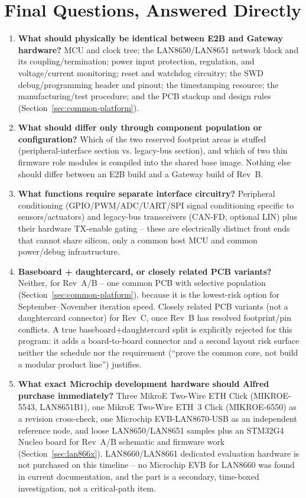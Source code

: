 \section{Final Questions, Answered Directly}
\label{sec:final-questions}

\begin{enumerate}[itemsep=0.4em]

\item \textbf{What should physically be identical between E2B and Gateway hardware?}
MCU and clock tree; the LAN8650/LAN8651 network block and its coupling/termination; power input protection, regulation, and voltage/current monitoring; reset and watchdog circuitry; the SWD debug/programming header and pinout; the timestamping resource; the manufacturing/test procedure; and the PCB stackup and design rules (Section~\ref{sec:common-platform}).

\item \textbf{What should differ only through component population or configuration?}
Which of the two reserved footprint areas is stuffed (peripheral-interface section vs. legacy-bus section), and which of two thin firmware role modules is compiled into the shared base image. Nothing else should differ between an E2B build and a Gateway build of Rev~B.

\item \textbf{What functions require separate interface circuitry?}
Peripheral conditioning (GPIO/PWM/ADC/UART/SPI signal conditioning specific to sensors/actuators) and legacy-bus transceivers (CAN-FD, optional LIN) plus their hardware TX-enable gating -- these are electrically distinct front ends that cannot share silicon, only a common host MCU and common power/debug infrastructure.

\item \textbf{Baseboard + daughtercard, or closely related PCB variants?}
Neither, for Rev~A/B -- one common PCB with selective population (Section~\ref{sec:common-platform}), because it is the lowest-risk option for September--November iteration speed. Closely related PCB variants (not a daughtercard connector) for Rev~C, once Rev~B has resolved footprint/pin conflicts. A true baseboard+daughtercard split is explicitly rejected for this program: it adds a board-to-board connector and a second layout risk surface neither the schedule nor the requirement (``prove the common core, not build a modular product line'') justifies.

\item \textbf{What exact Microchip development hardware should Alfred purchase immediately?}
Three MikroE Two-Wire ETH Click (MIKROE-5543, LAN8651B1), one MikroE Two-Wire ETH~3 Click (MIKROE-6550) as a revision cross-check, one Microchip EVB-LAN8670-USB as an independent reference node, and loose LAN8650/LAN8651 samples plus an STM32G4 Nucleo board for Rev~A/B schematic and firmware work (Section~\ref{sec:lan866x}). LAN8660/LAN8661 dedicated evaluation hardware is not purchased on this timeline -- no Microchip EVB for LAN8660 was found in current documentation, and the part is a secondary, time-boxed investigation, not a critical-path item.


\end{enumerate}
